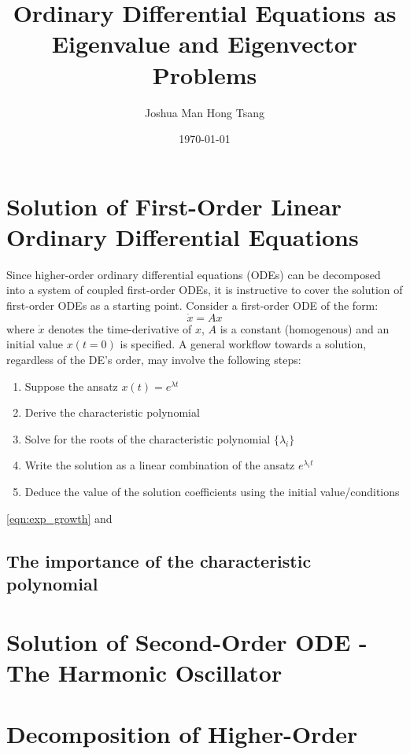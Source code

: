 \documentclass[a4paper,11pt,landscape]{article}
\title{Ordinary Differential Equations as Eigenvalue and Eigenvector Problems}
\author{Joshua Man Hong Tsang}
\date{\today}
\begin{document}
\maketitle
\tableofcontents

\begin{abstract}
\end{abstract}

\section{Solution of First-Order Linear Ordinary Differential Equations}

Since higher-order ordinary differential equations (ODEs) can be decomposed into a system of coupled first-order ODEs, it is instructive to cover the solution of first-order ODEs as a starting point. Consider a first-order ODE of the form:
\begin{equation} \label{eqn:exp_growth} 
    \dot{x} = Ax
\end{equation}
where $\dot{x}$ denotes the time-derivative of $x$, $A$ is a constant (homogenous) and an initial value $x(t=0)$ is specified.  A general workflow towards a solution, regardless of the DE's order, may involve the following steps:
\begin{enumerate}
  \item Suppose the ansatz $x(t)=e^{\lambda t}$
  \item Derive the characteristic polynomial
  \item Solve for the roots of the characteristic polynomial $\{\lambda_i\}$
  \item Write the solution as a linear combination of the ansatz $e^{\lambda_i t}$
  \item Deduce the value of the solution coefficients using the initial value/conditions
\end{enumerate}

\eqref{eqn:exp_growth} and

\subsection{The importance of the characteristic polynomial}


\section{Solution of Second-Order ODE - The Harmonic Oscillator}




\section{Decomposition of Higher-Order }
\end{document}
